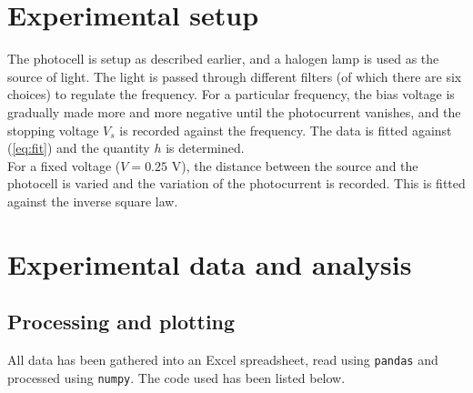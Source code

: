 \documentclass[11pt]{article}
\begin{document}
        \section{Experimental setup}
        The photocell is setup as described earlier, and a halogen lamp is used as the source of light. The light is passed through
        different filters (of which there are six choices) to regulate the frequency. For a particular frequency, the bias voltage
        is gradually made more and more negative until the photocurrent vanishes, and the stopping voltage $V_s$ is recorded against
        the frequency. The data is fitted against (\ref{eq:fit}) and the quantity $h$ is determined. \\

        For a fixed voltage ($V = 0.25$ V), the distance between the source and the photocell is varied and the variation of the photocurrent
        is recorded. This is fitted against the inverse square law.
        
        \section{Experimental data and analysis}
        
        \subsection{Processing and plotting}
        All data has been gathered into an Excel spreadsheet, read using \texttt{pandas} and processed using \texttt{numpy}.
        The code used has been listed below.
        
        
        
\end{document}
